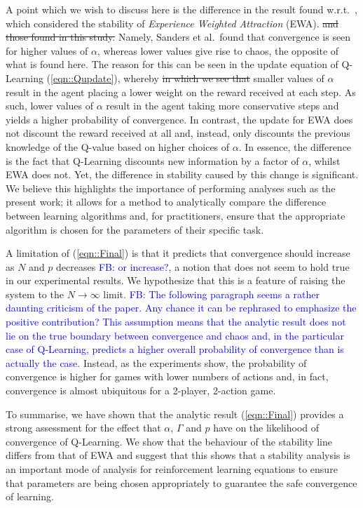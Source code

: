 \documentclass[sigconf]{aamas}
\newcommand\fb[1]{\textcolor{blue}{FB: #1}}
\begin{document}
A point which we wish to discuss here is the difference in the result found w.r.t.~\cite{Sanders2018}, which considered the stability of \textit{Experience Weighted Attraction} (EWA). \st{and those found in this study.} Namely, Sanders et al.~found that convergence is seen for higher values of $\alpha$, whereas lower values give rise to chaos, the opposite of what is found here. The reason for this can be seen in the update equation of Q-Learning (\ref{eqn::Qupdate}), whereby
\st{in which we see that} 
smaller values of $\alpha$ result in the agent placing a lower weight on the reward received at each step. As such, lower values of $\alpha$ result in the agent taking more conservative steps and yields a higher probability of convergence. In contrast, the update for EWA does not discount the reward received at all and, instead, only discounts the previous knowledge of the Q-value based on higher choices of $\alpha$. In essence, the difference is the fact that Q-Learning discounts new information by a factor of $\alpha$, whilst EWA does not. Yet, the difference in stability caused by this change is significant. We believe this highlights the importance of performing analyses such as the present work; it allows for a method to analytically compare the difference between learning algorithms and, for practitioners, ensure that the appropriate algorithm is chosen for the parameters of their specific task.

A limitation of (\ref{eqn::Final}) is that it predicts that convergence should increase as $N$ and $p$ decreases \fb{or increase?}, a notion that does not seem to hold true in our experimental results. We hypothesize that this is a feature of raising the system to the $N \rightarrow \infty$ limit. \fb{The following paragraph seems a rather daunting criticism of the paper. Any chance it can be rephrased to emphasize the positive contribution?  This assumption means that the analytic result does not lie on the true boundary between convergence and chaos and, in the particular case of Q-Learning, predicts a higher overall probability of convergence than is actually the case.} Instead, as the experiments show, the probability of convergence is higher for games with lower numbers of actions and, in fact, convergence is almost ubiquitous for a 2-player, 2-action game. 

To summarise, we have shown that the analytic result (\ref{eqn::Final}) provides a strong assessment for the effect that $\alpha$, $\Gamma$ and $p$ have on the likelihood of convergence of Q-Learning. We show that the behaviour of the stability line differs from that of EWA and suggest that this shows that a stability analysis is an important mode of analysis for reinforcement learning equations to ensure that parameters are being chosen appropriately to guarantee the safe convergence of learning. 
\end{document}
